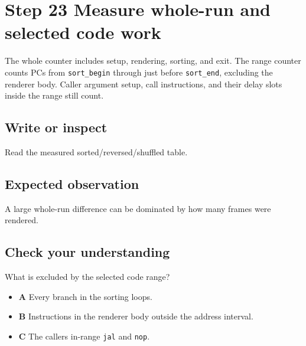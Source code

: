 \section{Step 23 Measure whole-run and selected code
  work}\label{009-sorting-visualizer-s23-step-23-measure-whole-run-and-selected-code-work}

The whole counter includes setup, rendering, sorting, and exit. The
range counter counts PCs from \texttt{sort\_begin} through just before
\texttt{sort\_end}, excluding the renderer body. Caller argument setup,
call instructions, and their delay slots inside the range still count.

\subsection{Write or
  inspect}\label{009-sorting-visualizer-s23-write-or-inspect}

Read the measured sorted/reversed/shuffled table.

\subsection{Expected
  observation}\label{009-sorting-visualizer-s23-expected-observation}

A large whole-run difference can be dominated by how many frames were
rendered.

\subsection{Check your
  understanding}\label{009-sorting-visualizer-s23-check-your-understanding}

What is excluded by the selected code range?

\begin{itemize}
  \tightlist
  \item
        \textbf{A} Every branch in the sorting loops.
  \item
        \textbf{B} Instructions in the renderer body outside the address
        interval.
  \item
        \textbf{C} The caller\textquotesingle s in-range \texttt{jal} and
        \texttt{nop}.
\end{itemize}
